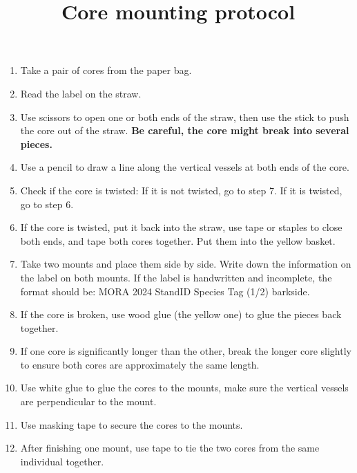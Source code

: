 \documentclass[11pt,letter]{article}
\begin{document}
\title{Core mounting protocol} 

\setlength{\parindent}{0pt}
\setlength{\parskip}{3pt}
\begin{enumerate}
\item Take a pair of cores from the paper bag.
\item Read the label on the straw.
\item Use scissors to open one or both ends of the straw, then use the stick to push the core out of the straw. \textbf{Be careful, the core might break into several pieces.}
\item Use a pencil to draw a line along the vertical vessels at both ends of the core.
\item Check if the core is twisted: If it is not twisted, go to step 7. If it is twisted, go to step 6.
\item If the core is twisted, put it back into the straw, use tape or staples to close both ends, and tape both cores together. Put them into the yellow basket.
\item Take two mounts and place them side by side. Write down the information on the label on both mounts. If the label is handwritten and incomplete, the format should be: MORA 2024 StandID Species Tag (1/2) barkside.
\item If the core is broken, use wood glue (the yellow one) to glue the pieces back together.
\item If one core is significantly longer than the other, break the longer core slightly to ensure both cores are approximately the same length.
\item Use white glue to glue the cores to the mounts, make sure the vertical vessels are perpendicular to the mount.
\item Use masking tape to secure the cores to the mounts.
\item After finishing one mount, use tape to tie the two cores from the same individual together.
	\end{enumerate}
\end{document}
